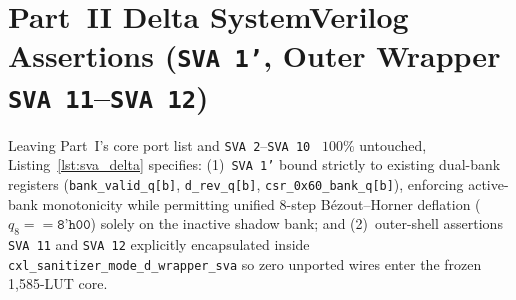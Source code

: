 \documentclass[10pt,twocolumn]{article}
\providecommand{\CoreClbLuts}{1,585}
\theoremstyle{spectralthm}
\begin{document}
\section{Part~II Delta SystemVerilog Assertions (\texorpdfstring{\texttt{SVA 1'}}{SVA 1'}, Outer Wrapper \texorpdfstring{\texttt{SVA 11}--\texttt{SVA 12}}{SVA 11--SVA 12})}
\label{app:sva_delta}

Leaving Part~I's core port list and \texttt{SVA 2}--\texttt{SVA 10}~\cite{murphy2026part1} $100\%$ untouched, Listing~\ref{lst:sva_delta} specifies: (1)~\texttt{SVA 1'} bound strictly to existing dual-bank registers (\texttt{bank\_valid\_q[b]}, \texttt{d\_rev\_q[b]}, \texttt{csr\_0x60\_bank\_q[b]}), enforcing active-bank monotonicity while permitting unified 8-step B\'{e}zout--Horner deflation ($q_8 == \texttt{8'h00}$) solely on the inactive shadow bank; and (2)~outer-shell assertions \texttt{SVA 11} and \texttt{SVA 12} explicitly encapsulated inside \texttt{cxl\_sanitizer\_mode\_d\_wrapper\_sva} so zero unported wires enter the frozen \CoreClbLuts-LUT core.
\end{document}
